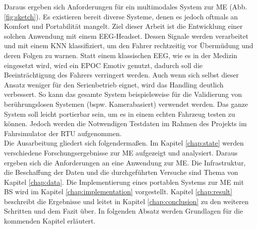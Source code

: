 Daraus ergeben sich Anforderungen für ein multimodales System zur \acl{ME}  (Abb. \ref{fig:sketch}). Es existieren bereit diverse Systeme, denen es jedoch oftmals an Komfort und Portabilität mangelt. Ziel dieser Arbeit ist die Entwicklung einer solchen Anwendung mit einem EEG-Headset. 
Dessen Signale werden verarbeitet und mit einem KNN klassifiziert, um den Fahrer rechtzeitig vor Übermüdung und deren Folgen zu warnen.
Statt einem klassischen EEG, wie es in der Medizin eingesetzt wird, wird ein EPOC Emotiv genutzt, dadurch soll die Beeinträchtigung des Fahrers verringert werden. Auch wenn sich selbst dieser Ansatz weniger für den Serienbetrieb eignet, wird das Handling deutlich verbessert. So kann das gesamte System beispielsweise für die Validierung von berührungslosen Systemen (bspw. Kamerabasiert) verwendet werden. Das ganze System soll leicht portierbar sein, um es in einem echten Fahrzeug testen zu können. Jedoch werden die Notwendigen Testdaten im Rahmen des Projekts im Fahrsimulator der \acl{RTU} aufgenommen.
\\ 

Die Ausarbeitung gliedert sich folgendermaßen. Im Kapitel \ref{chap:state} werden verschiedene Forschungsergebnisse zur \acl{ME} aufgezeigt und analysiert. Daraus ergeben sich die Anforderungen an eine Anwendung zur \acl{ME}. Die Infrastruktur, die Beschaffung der Daten und die durchgeführten Versuche sind Thema von Kapitel \ref{chap:data}. Die Implementierung eines portablen Systems zur \acl{ME} mit \acl{BS} wird im Kapitel \ref{chap:implementation} vorgestellt. Kapitel \ref{chap:result} beschreibt die Ergebnisse und leitet in Kapitel \ref{chap:conclusion} zu den weiteren Schritten und dem Fazit über. In folgenden Absatz werden Grundlagen für die kommenden Kapitel erläutert.